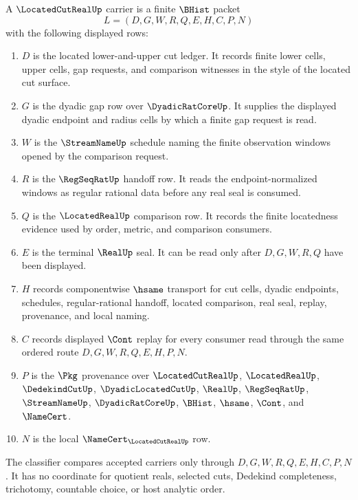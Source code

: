 \begin{definition}
\label{def:located-cut-real-carrier}
A $\LocatedCutRealUp$ carrier is a finite $\BHist$ packet
$$
L=(D,G,W,R,Q,E,H,C,P,N)
$$
with the following displayed rows:
\begin{enumerate}
\item $D$ is the located lower-and-upper cut ledger. It records finite lower cells, upper cells, gap requests, and comparison witnesses in the style of the located cut surface.
\item $G$ is the dyadic gap row over $\DyadicRatCoreUp$. It supplies the displayed dyadic endpoint and radius cells by which a finite gap request is read.
\item $W$ is the $\StreamNameUp$ schedule naming the finite observation windows opened by the comparison request.
\item $R$ is the $\RegSeqRatUp$ handoff row. It reads the endpoint-normalized windows as regular rational data before any real seal is consumed.
\item $Q$ is the $\LocatedRealUp$ comparison row. It records the finite locatedness evidence used by order, metric, and comparison consumers.
\item $E$ is the terminal $\RealUp$ seal. It can be read only after $D,G,W,R,Q$ have been displayed.
\item $H$ records componentwise $\hsame$ transport for cut cells, dyadic endpoints, schedules, regular-rational handoff, located comparison, real seal, replay, provenance, and local naming.
\item $C$ records displayed $\Cont$ replay for every consumer read through the same ordered route $D,G,W,R,Q,E,H,P,N$.
\item $P$ is the $\Pkg$ provenance over $\LocatedCutRealUp$, $\LocatedRealUp$, $\DedekindCutUp$, $\DyadicLocatedCutUp$, $\RealUp$, $\RegSeqRatUp$, $\StreamNameUp$, $\DyadicRatCoreUp$, $\BHist$, $\hsame$, $\Cont$, and $\NameCert$.
\item $N$ is the local $\NameCert_{\LocatedCutRealUp}$ row.
\end{enumerate}
The classifier compares accepted carriers only through $D,G,W,R,Q,E,H,C,P,N$. It has no coordinate for quotient reals, selected cuts, Dedekind completeness, trichotomy, countable choice, or host analytic order.
\end{definition}

